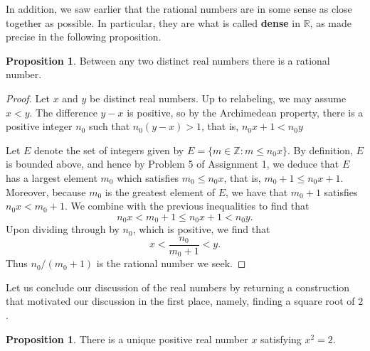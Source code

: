 \documentclass[12pt]{article}
\theoremstyle{definition}
\theoremstyle{theorem}
\newtheorem{proposition}[definition]{Proposition}
\begin{document}
In addition, we saw earlier that the rational numbers are in some sense as close together as possible. In particular, they are what is called \textbf{dense} in $\mathbb{R}$, as made precise in the following proposition. 

\begin{proposition}
Between any two distinct real numbers there is a rational number. 
\end{proposition}

\begin{proof}
Let $x$ and $y$ be distinct real numbers. Up to relabeling, we may assume $x < y$. The difference $y - x$ is positive, so by the Archimedean property, there is a positive integer $n_0$ such that $n_0(y-x) > 1$, that is, $n_0x + 1 < n_0y$

Let $E$ denote the set of integers given by $E = \{m \in \mathbb{Z} : m \leqslant n_0x\}$. By definition, $E$ is bounded above, and hence by Problem 5 of Assignment 1, we deduce that $E$ has a largest element $m_0$ which satisfies $m_0 \leqslant n_0x$, that is, $m_0 + 1 \leqslant n_0x + 1$. Moreover, because $m_0$ is the greatest element of $E$, we have that $m_0 + 1$ satisfies $n_0x < m_0 + 1$. We combine with the previous inequalities to find that 
\[
n_0x < m_0 + 1 \leqslant n_0x + 1 < n_0y.
\]
Upon dividing through by $n_0$, which is positive, we find that 
\[
x < \frac{n_0}{m_0 + 1} < y.
\]
Thus $n_0/(m_0 + 1)$ is the rational number we seek.
\end{proof}

Let us conclude our discussion of the real numbers by returning a construction that motivated our discussion in the first place, namely, finding a square root of $2$. 

\begin{proposition}
There is a unique positive real number $x$ satisfying $x^2 = 2$. 
\end{proposition}
\end{document}
